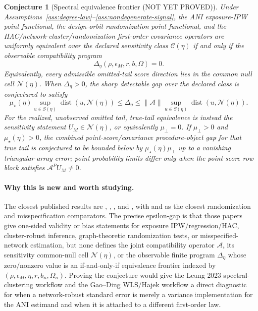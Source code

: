 \documentclass[11pt]{article}
\theoremstyle{definition}
\theoremstyle{plain}
\newtheorem{conjecture}{Conjecture}
\theoremstyle{remark}
\begin{document}
\begin{conjecture}[Spectral equivalence frontier (NOT YET PROVED)]\label{conj:spectral-frontier}
Under Assumptions~\ref{ass:degree-law}--\ref{ass:nondegenerate-signal}, the
ANI exposure-IPW point functional, the design-orbit randomization point
functional, and the HAC/network-cluster/randomization first-order covariance
operators are uniformly equivalent over the declared sensitivity class
\(\mathcal C(\eta)\) if and only if the observable compatibility program
\[
  \Delta_\eta(\rho,\epsilon_M,r,b,\Omega)=0.
\]
Equivalently, every admissible omitted-tail score direction lies in the common
null cell \(\mathcal N(\eta)\).  When \(\Delta_\eta>0\), the sharp detectable
gap over the declared class is conjectured to satisfy
\[
  \mu_\star(\eta)
  \sup_{u\in S(\eta)}\operatorname{dist}(u,\mathcal N(\eta))
  \le
  \Delta_\eta
  \le
  \|\mathcal A\|
  \sup_{u\in S(\eta)}\operatorname{dist}(u,\mathcal N(\eta)).
\]
For the realized, unobserved omitted tail, true-tail equivalence is instead
the sensitivity statement \(U_M\in\mathcal N(\eta)\), or equivalently
\(\mu_{\perp}=0\).  If \(\mu_{\perp}>0\) and \(\mu_\star(\eta)>0\), the
combined point-score/covariance procedure-object gap for that true tail is
conjectured to be bounded below by \(\mu_\star(\eta)\mu_{\perp}\) up to a
vanishing triangular-array error; point probability limits differ only when
the point-score row block satisfies \(\mathcal A^P U_M\ne0\).
\end{conjecture}

\paragraph{Why this is new and worth studying.}
The closest published results are \citet{Leung2022ANI},
\citet{Leung2023NCRI}, \citet{BasseDingFellerToulis2024}, and
\citet{GaoDing2025Network}, with \citet{PuelzBasseFellerToulis2022} and
\citet{WeinsteinNevo2026} as the closest randomization and misspecification
comparators.  The precise epsilon-gap is that those papers give one-sided
validity or bias statements for exposure IPW/regression/HAC, cluster-robust
inference, graph-theoretic randomization tests, or misspecified-network
estimation, but none defines the joint compatibility operator \(\mathcal A\),
its sensitivity common-null cell \(\mathcal N(\eta)\), or the observable
finite program \(\Delta_\eta\) whose zero/nonzero value is an if-and-only-if
equivalence frontier indexed by
\((\rho,\epsilon_M,\eta,r,b_n,\Omega_n)\).  Proving the conjecture would
give the Leung 2023 spectral-clustering workflow and the Gao--Ding WLS/Hajek
workflow a direct diagnostic for when a network-robust standard error is merely
a variance implementation for the ANI estimand and when it is attached to a
different first-order law.
\end{document}

